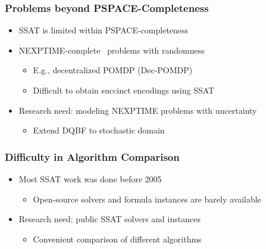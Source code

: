 \begin{frame}
      \frametitle{Problems beyond PSPACE-Completeness}
      \begin{itemize}
            \item SSAT is limited within PSPACE-completeness
                  \pause
            \item NEXPTIME-complete~\cite{Peterson1979} problems with randomness
                  \begin{itemize}
                        \item E.g., decentralized POMDP (Dec-POMDP)~\cite{Bernstein2002}
                        \item Difficult to obtain succinct encodings using SSAT
                  \end{itemize}
                  \pause
            \item \alert{Research need: modeling NEXPTIME problems with uncertainty}
                  \begin{itemize}
                        \item Extend DQBF to stochastic domain
                  \end{itemize}
      \end{itemize}
\end{frame}

\begin{frame}
      \frametitle{Difficulty in Algorithm Comparison}
      \begin{itemize}
            \item Most SSAT work was done before 2005~\cite{Majercik1998,Majercik2003,Majercik2004,Majercik2005}
                  \begin{itemize}
                        \item Open-source solvers and formula instances are barely available
                  \end{itemize}
                  \pause
            \item \alert{Research need: public SSAT solvers and instances}
                  \begin{itemize}
                        \item Convenient comparison of different algorithms
                  \end{itemize}
      \end{itemize}
\end{frame}